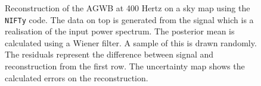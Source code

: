 \begin{figure}[h]
    \centering
    \newline
    \vspace{-1cm}
    \caption{Reconstruction of the AGWB at 400 Hertz on a sky map using the {\tt NIFTy} code. The data on top is generated from the signal which is a realisation of the input power spectrum. The posterior mean is calculated using a Wiener filter. A sample of this is drawn randomly. The residuals represent the difference between signal and reconstruction from the first row. The uncertainty map shows the calculated errors on the reconstruction.}
    \label{sky_maps_400}
\end{figure}

